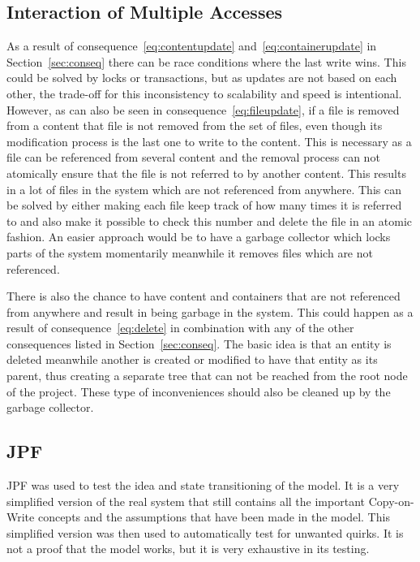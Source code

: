 \documentclass[a4paper,12pt]{article}
\begin{document}
\subsection{Interaction of Multiple Accesses} \label{sec:multiple_access}
As a result of consequence~\ref{eq:contentupdate} and~\ref{eq:containerupdate} in
Section~\ref{sec:conseq} there can be race conditions where the last write wins. This could be
solved by locks or transactions, but as updates are not based on each other, the trade-off for this
inconsistency to scalability and speed is intentional. However, as can also be seen in
consequence~\ref{eq:fileupdate}, if a file is removed from a content that file is not removed from
the set of files, even though its modification process is the last one to write to the content.
This is necessary as a file can be referenced from several content and the removal process can not
atomically ensure that the file is not referred to by another content. This results in a lot of
files in the system which are not referenced from anywhere. This can be solved by either making each
file keep track of how many times it is referred to and also make it possible to check this number
and delete the file in an atomic fashion. An easier approach would be to have a garbage collector
which locks parts of the system momentarily meanwhile it removes files which are not referenced. 

\par
There is also the chance to have content and containers that are not referenced from anywhere and
result in being garbage in the system. This could happen as a result of consequence~\ref{eq:delete}
in combination with any of the other consequences listed in Section~\ref{sec:conseq}. The basic idea
is that an entity is deleted meanwhile another is created or modified to have that entity as its
parent, thus creating a separate tree that can not be reached from the root node of the project.
These type of inconveniences should also be cleaned up by the garbage collector.

\subsection{JPF}
JPF was used to test the idea and state transitioning of the model. It is a very simplified
version of the real system that still contains all the important Copy-on-Write concepts and the 
assumptions that have been made in the model. This simplified version was then used to automatically
test for unwanted quirks. It is not a proof that the model works, but it is very exhaustive in its
testing.
\end{document}
